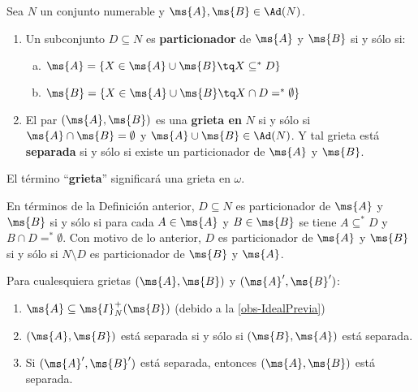 	\begin{definicion}\label{Def-particionador}\label{def-grieta}
		Sea $N$ un conjunto numerable y $\ms{A},\ms{B} \in \Ad(N)$. 
		\begin{enumerate}
			\item Un subconjunto $D \subseteq N$ es \textbf{particionador} de $\ms{A}$ y $\ms{B}$ si y sólo si:
			\begin{enumerate}[a)]
				\item $\ms{A}=\{X \in \ms{A} \cup \ms{B} \tq X \subseteq ^* D\}$
				\item $\ms{B}=\{X \in \ms{A} \cup \ms{B} \tq X \cap D =^* \emptyset\}$
			\end{enumerate}
			\item El par $(\ms{A},\ms{B})$ es una \textbf{grieta en} $N$ si y sólo si $\ms{A} \cap \ms{B}=\emptyset$ y $\ms{A} \cup \ms{B} \in \Ad(N)$. Y tal grieta está \textbf{separada} si y sólo si existe un particionador de $\ms{A}$ y $\ms{B}$.
		\end{enumerate}
		El término ``\textbf{grieta}'' significará una grieta en $\omega$.		
	\end{definicion}

	En términos de la Definición anterior, $D \subseteq N$ es particionador de $\ms{A}$ y $\ms{B}$ si y sólo si para cada $A \in \ms{A}$ y $B \in \ms{B}$ se tiene $A \subseteq^* D$ y $B \cap D =^* \emptyset$. Con motivo de lo anterior, $D$ es particionador de $\ms{A}$ y $\ms{B}$ si y sólo si $N \setminus D$ es particionador de $\ms{B}$ y $\ms{A}$.

	\begin{observacion}\label{obs-GrietasSimple}
		Para cualesquiera grietas $(\ms{A},\ms{B})$ y $(\ms{A}',\ms{B}')$:
		\begin{enumerate}
			\item $\ms{A} \subseteq \ms{I}_N^+(\ms{B})$ (debido a la \autoref{obs-IdealPrevia})
			\item $(\ms{A},\ms{B})$ está separada si y sólo si $(\ms{B},\ms{A})$ está separada.
			\item Si $(\ms{A}',\ms{B}')$ está separada, entonces $(\ms{A},\ms{B})$ está separada.
		\end{enumerate}
	\end{observacion}

